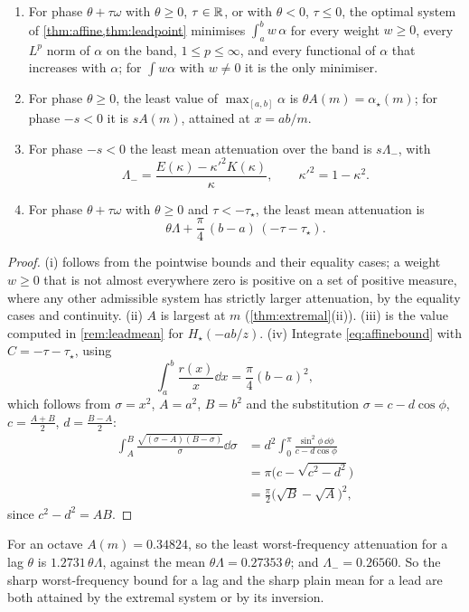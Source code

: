 \begin{corollary}\label{cor:pointwisecons}
\begin{enumerate}
\item[(i)] For phase $\theta+\tau\omega$ with $\theta\ge0$, $\tau\in\mathbb R$, or
with $\theta<0$, $\tau\le0$, the optimal system of
\cref{thm:affine,thm:leadpoint} minimises $\int_a^bw\,\alpha$ for every
weight $w\ge0$, every $L^p$ norm of $\alpha$ on the band, $1\le p\le\infty$,
and every functional of $\alpha$ that increases with $\alpha$; for
$\int w\alpha$ with $w\ne0$ it is the only minimiser.
\item[(ii)] For phase $\theta\ge0$, the least value of $\max_{[a,b]}\alpha$ is
$\theta A(m)=\alpha_\star(m)$; for phase $-s<0$ it is $sA(m)$, attained at
$x=ab/m$.
\item[(iii)] For phase $-s<0$ the least mean attenuation over the band is
$s\Lambda_-$, with
\[
\Lambda_-=\frac{E(\kappa)-\kappa'^2K(\kappa)}{\kappa},\qquad\kappa'^2=1-\kappa^2 .
\]
\item[(iv)] For phase $\theta+\tau\omega$ with $\theta\ge0$ and
$\tau<-\tau_\star$, the least mean attenuation is
\[
\theta\Lambda+\frac\pi4\,(b-a)\,(-\tau-\tau_\star).
\]
\end{enumerate}
\end{corollary}

\begin{proof}
(i) follows from the pointwise bounds and their equality cases; a weight
$w\ge0$ that is not almost everywhere zero is positive on a set of positive
measure, where any other admissible system has strictly larger
attenuation, by the equality cases and continuity. (ii) $A$ is largest at
$m$ (\cref{thm:extremal}(ii)). (iii) is the value computed in
\cref{rem:leadmean} for $H_\star(-ab/z)$. (iv) Integrate
\eqref{eq:affinebound} with $C=-\tau-\tau_\star$, using
\[
\int_a^b\frac{r(x)}x\dd x=\frac\pi4(b-a)^2 ,
\]
which follows from $\sigma=x^2$, $A=a^2$, $B=b^2$ and the substitution
$\sigma=c-d\cos\phi$, $c=\frac{A+B}2$, $d=\frac{B-A}2$:
\begin{align*}
\int_A^B\frac{\sqrt{(\sigma-A)(B-\sigma)}}\sigma\dd\sigma
&=d^2\int_0^\pi\frac{\sin^2\phi\,\dd\phi}{c-d\cos\phi}\\
&=\pi\big(c-\sqrt{c^2-d^2}\big)\\
&=\frac\pi2\big(\sqrt B-\sqrt A\big)^2 ,
\end{align*}
since $c^2-d^2=AB$.
\end{proof}

For an octave $A(m)=0.34824$, so the least worst-frequency attenuation for a
lag $\theta$ is $1.2731\,\theta\Lambda$, against the mean $\theta\Lambda=0.27353\,\theta$;
and $\Lambda_-=0.26560$. So the sharp worst-frequency bound for a lag and the sharp plain mean for
a lead are both attained by the extremal system or by its inversion.

